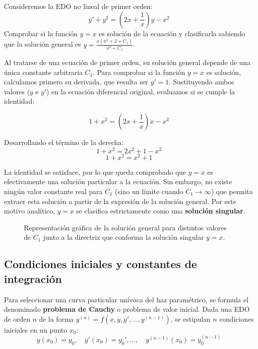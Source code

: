 \vspace{0.5cm}

\begin{ejercicio}
Consideremos la EDO no lineal de primer orden: 
$$ y' + y^2 = \left(2x + \frac{1}{x}\right)y - x^2 $$
Comprobar si la función $y = x$ es solución de la ecuación y clasificarla sabiendo que la solución general es $y = \frac{x(x^2 + 2 + C_1)}{x^2 + C_1}$.
\end{ejercicio}

\begin{tcolorbox}
Al tratarse de una ecuación de primer orden, su solución general depende de una única constante arbitraria $C_1$. 
Para comprobar si la función $y = x$ es solución, calculamos primero su derivada, que resulta ser $y' = 1$. Sustituyendo ambos valores ($y$ e $y'$) en la ecuación diferencial original, evaluamos si se cumple la identidad:

$$ 1 + x^2 = \left(2x + \frac{1}{x}\right)x - x^2 $$

Desarrollando el término de la derecha:
$$ 1 + x^2 = 2x^2 + 1 - x^2 $$
$$ 1 + x^2 = x^2 + 1 $$

La identidad se satisface, por lo que queda comprobado que $y = x$ es efectivamente una solución particular a la ecuación. Sin embargo, no existe ningún valor constante real para $C_1$ (sino un límite cuando $C_1 \to \infty$) que permita extraer esta solución a partir de la expresión de la solución general. Por este motivo analítico, $y = x$ se clasifica estrictamente como una \textbf{solución singular}.

\begin{figure}[H]
    \centering
    
    \caption{Representación gráfica de la solución general para distintos valores de $C_1$ junto a la directriz que conforma la solución singular $y=x$.}
\end{figure}
\end{tcolorbox}

\vspace{0.5cm}

\subsection{Condiciones iniciales y constantes de integración}

Para seleccionar una curva particular unívoca del haz paramétrico, se formula el denominado \textbf{problema de Cauchy} o problema de valor inicial. Dada una EDO de orden $n$ de la forma $y^{(n)} = f(x, y, y', \dots, y^{(n-1)})$, se estipulan $n$ condiciones iniciales en un punto $x_0$:
$$ y(x_0) = y_0, \quad y'(x_0) = y_0', \dots, \quad y^{(n-1)}(x_0) = y_0^{(n-1)} $$

